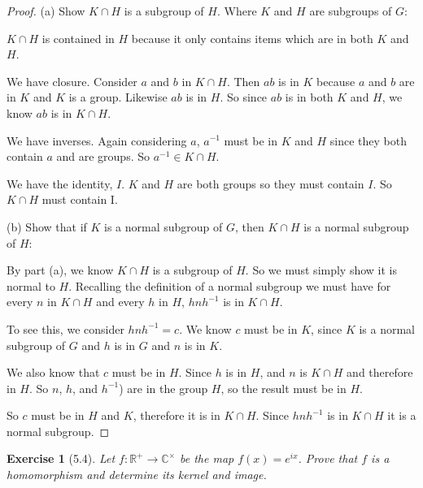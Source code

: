 \documentclass[12pt,leqno]{article}
\numberwithin{equation}{section}
\newtheorem*{exer}{Exercise}
\theoremstyle{definition}
\begin{document}
\begin{proof}[Proof]
    
\item[(a)] Show $K \cap H$ is a subgroup of $H$. Where $K$ and $H$ are
    subgroups of $G$:

    $K \cap H$ is contained in $H$ because it only contains items
    which are in both $K$ and $H$.

    We have closure. Consider $a$ and $b$ in $K \cap H$. Then $ab$ is in $K$
    because $a$ and $b$ are in $K$ and $K$ is a group. Likewise $ab$ is in
    $H$. So since $ab$ is in both $K$ and $H$, we know $ab$ is in $K \cap H$.

    We have inverses. Again considering $a$, $a^{-1}$ must be in $K$ and $H$
    since they both contain $a$ and are groups. So $a^{-1} \in K \cap H$. 

    We have the identity, $I$. $K$ and $H$ are both groups so they must contain
    $I$. So $K \cap H$ must contain I.

\item[(b)] Show that if $K$ is a normal subgroup of $G$, then $K \cap H$ is a
    normal subgroup of $H$:

    By part (a), we know $K \cap H$ is a subgroup of $H$. So we must simply
    show it is normal to $H$.  Recalling the definition of a normal subgroup we
    must have for every $n$ in $K \cap H$ and every $h$ in $H$, $hnh^{-1}$ is
    in $K \cap H$.

    To see this, we consider $hnh^{-1} = c$. We know $c$ must be in $K$, since
    $K$ is a normal subgroup of $G$ and $h$ is in $G$ and $n$ is in $K$. 
    
    We also know that $c$ must be in $H$. Since $h$ is in $H$, and $n$ is $K
    \cap H$ and therefore in $H$. So $n$, $h$, and $h^{-1}$) are in the group
    $H$, so the result must be in $H$.

    So $c$ must be in $H$ and $K$, therefore it is in $K \cap H$. Since
    $hnh^{-1}$ is in $K \cap H$ it is a normal subgroup.
    
\end{proof}


\begin{exer}[5.4]
Let $f:\mathbb R^{+} \rightarrow \mathbb C^{\times}$ be the map $f(x)=e^{ix}$.
Prove that $f$ is a homomorphism and determine its kernel and image.
\end{exer}
\end{document}
